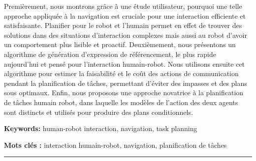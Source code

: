 \documentclass[english,a4paper,11pt,twoside]{StyleThese}
\begin{document}
\begin{vcenterpage}
Premièrement, nous montrons grâce à une étude utilisateur, pourquoi une telle approche appliquée à la navigation est cruciale pour une interaction efficiente et satisfaisante. Planifier pour le robot et l'humain permet en effet de trouver des solutions dans des situations d'interaction complexes mais aussi au robot d'avoir un comportement plus lisible et proactif. Deuxièmement, nous présentons un algorithme de génération d'expression de référencement, le plus rapide aujourd'hui et pensé pour l'interaction humain-robot. Nous utilisons ensuite cet algorithme pour estimer la faisabilité et le coût des actions de communication pendant la planification de tâches, permettant d'éviter des impasses et des plans sous optimaux. Enfin, nous proposons une approche novatrice à la planification de tâches humain robot, dans laquelle les modèles de l'action des deux agents sont distincts et utilisés pour produire des plans conditionnels.

\textbf{Keywords:} human-robot interaction, navigation, task planning

\textbf{Mots clés :} interaction humain-robot, navigation, planification de tâches
\\
\noindent\rule[2pt]{\textwidth}{0.5pt}
\end{vcenterpage}
\end{document}
